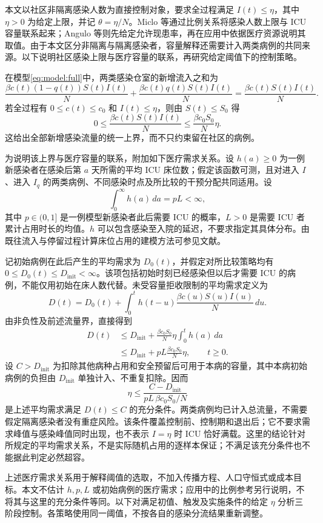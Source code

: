 本文以社区非隔离感染人数为直接控制对象，要求全过程满足 $I(t)\le\eta$，其中 $\eta>0$ 为给定上限，并记 $\theta=\eta/N$。Miclo 等\cite{Miclo2022ICU}通过比例关系将感染人数上限与 ICU 容量联系起来；Angulo 等\cite{Angulo2021}则先给定允许现患率，再在应用中依据医疗资源说明其取值。由于本文区分非隔离与隔离感染者，容量解释还需要计入两类病例的共同来源。以下说明社区感染上限与医疗容量的联系，再研究给定阈值下的控制策略。

\begin{remark}
在模型\eqref{eq:model:full}中，两类感染仓室的新增流入之和为
\[
\frac{\beta c(t)(1-q(t))S(t)I(t)}{N}
+\frac{\beta c(t)q(t)S(t)I(t)}{N}
=\frac{\beta c(t)S(t)I(t)}{N}.
\]
若全过程有 $0\le c(t)\le c_0$ 和 $I(t)\le\eta$，则由 $S(t)\le S_0$ 得
\[
0\le\frac{\beta c(t)S(t)I(t)}{N}
\le\frac{\beta c_0S_0}{N}\eta.
\]
这给出全部新增感染流量的统一上界，而不只约束留在社区的病例。

为说明该上界与医疗容量的联系，附加如下医疗需求关系。设 $h(a)\ge0$ 为一例新感染者在感染后第 $a$ 天所需的平均 ICU 床位数；假定该函数可测，且对进入 $I$、进入 $I_q$ 的两类病例、不同感染时点及所比较的干预分配共同适用。设
\[
\int_0^\infty h(a)\,da=pL<\infty,
\]
其中 $p\in(0,1]$ 是一例模型新感染者此后需要 ICU 的概率，$L>0$ 是需要 ICU 者累计占用时长的均值。$h$ 可以包含感染至入院的延迟，不要求指定其具体分布。由既往流入与停留过程计算床位占用的建模方法可参见文献\cite{Baas2021Occupancy}。

记初始病例在此后产生的平均需求为 $D_0(t)$，并假定对所比较策略均有 $0\le D_0(t)\le D_{\mathrm{init}}<\infty$。该项包括初始时刻已经感染但以后才需要 ICU 的病例，不能仅用初始在床人数代替。未受容量拒收限制的平均需求定义为
\[
D(t)=D_0(t)+\int_0^t h(t-u)
\frac{\beta c(u)S(u)I(u)}{N}\,du.
\]
由非负性及前述流量界，直接得到
\[
\begin{aligned}
D(t)
&\le D_{\mathrm{init}}+
\frac{\beta c_0S_0}{N}\eta\int_0^t h(a)\,da\\
&\le D_{\mathrm{init}}+pL\frac{\beta c_0S_0}{N}\eta,
\qquad t\ge0.
\end{aligned}
\]
设 $C>D_{\mathrm{init}}$ 为扣除其他病种占用和安全预留后可用于本病的容量，其中本病初始病例的负担由 $D_{\mathrm{init}}$ 单独计入、不重复扣除。因而
\[
\eta\le\frac{C-D_{\mathrm{init}}}{pL\,\beta c_0S_0/N}
\]
是上述平均需求满足 $D(t)\le C$ 的充分条件。两类病例均已计入总流量，不需要假定隔离感染者没有重症风险。该条件覆盖控制前、控制期和退出后；它不要求需求峰值与感染峰值同时出现，也不表示 $I=\eta$ 时 ICU 恰好满载。这里的结论针对所规定的平均需求关系，不是实际随机占用的逐样本保证；不满足该充分条件也不能据此判定必然超容。
\end{remark}

上述医疗需求关系用于解释阈值的选取，不加入传播方程、人口守恒式或成本目标。本文不估计 $h,p,L$ 或初始病例的医疗需求；应用中的比例参考另行说明，不将其与这里的充分条件等同。以下对满足初值、触发及实施条件的给定 $\eta$ 分析三阶段控制。各策略使用同一阈值，不按各自的感染分流结果重新调整。
